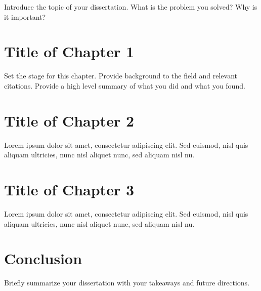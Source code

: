\begin{dissertationintroduction}
    Introduce the topic of your dissertation. What is the problem you solved? Why is it important? 
    
    \section{Title of Chapter 1}

    Set the stage for this chapter. Provide background to the field and relevant citations. Provide a high level summary of what you did and what you found.

    \section{Title of Chapter 2}

    Lorem ipsum dolor sit amet, consectetur adipiscing elit. Sed euismod, nisl quis aliquam ultricies, nunc nisl aliquet nunc, sed aliquam nisl nu.

    \section{Title of Chapter 3}

    Lorem ipsum dolor sit amet, consectetur adipiscing elit. Sed euismod, nisl quis aliquam ultricies, nunc nisl aliquet nunc, sed aliquam nisl nu.

    \section{Conclusion}

    Briefly summarize your dissertation with your takeaways and future directions.
    
\end{dissertationintroduction}
